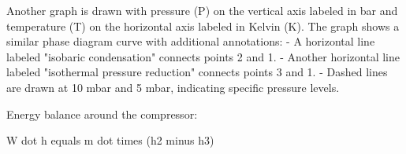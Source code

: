 Another graph is drawn with pressure (P) on the vertical axis labeled in bar and temperature (T) on the horizontal axis labeled in Kelvin (K). The graph shows a similar phase diagram curve with additional annotations:  
- A horizontal line labeled "isobaric condensation" connects points 2 and 1.  
- Another horizontal line labeled "isothermal pressure reduction" connects points 3 and 1.  
- Dashed lines are drawn at 10 mbar and 5 mbar, indicating specific pressure levels.

Energy balance around the compressor:  

W dot h equals m dot times (h2 minus h3)